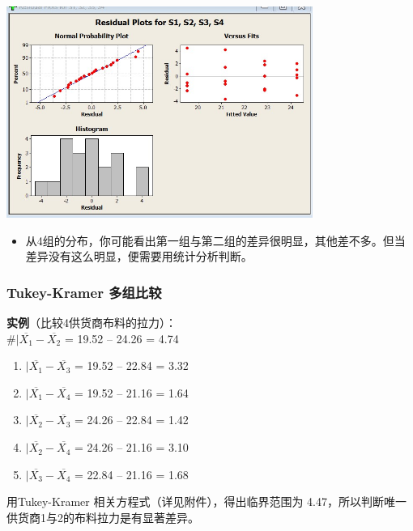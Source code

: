 
\includegraphics[width=10cm]{Anova3inOneScreenshot_2022-08-07_125131.jpg}

\begin{itemize}
\tightlist
\item
  从4组的分布，你可能看出第一组与第二组的差异很明显，其他差不多。但当差异没有这么明显，便需要用统计分析判断。
\end{itemize}

\hypertarget{tukey-kramer-ux591aux7ec4ux6bd4ux8f83}{%
\subsubsection{Tukey-Kramer
多组比较}\label{tukey-kramer-ux591aux7ec4ux6bd4ux8f83}}

\textbf{实例}（比较4供货商布料的拉力）：\\
\#\(|\overline{X_1} - \overline{X_2}\) = \textbar{}19.52 --
24.26\textbar{} = 4.74

\begin{enumerate}
\tightlist
\item
  \(|\overline{X_1} - \overline{X_3}\) = \textbar{}19.52 --
  22.84\textbar{} = 3.32
\item
  \(|\overline{X_1} - \overline{X_4}\) = \textbar{}19.52 --
  21.16\textbar{} = 1.64
\item
  \(|\overline{X_2} - \overline{X_3}\) = \textbar{}24.26 --
  22.84\textbar{} = 1.42
\item
  \(|\overline{X_2} - \overline{X_4}\) = \textbar{}24.26 --
  21.16\textbar{} = 3.10
\item
  \(|\overline{X_3} - \overline{X_4}\) = \textbar{}22.84 --
  21.16\textbar{} = 1.68
\end{enumerate}

用Tukey-Kramer 相关方程式（详见附件），得出临界范围为 4.47，所以判断唯一供货商1与2的布料拉力是有显著差异。 

